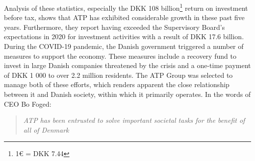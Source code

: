 Analysis of these statistics, especially the DKK 108 billion\footnote[0]{1€  = DKK 7.44} return on investment before tax, shows that ATP has exhibited considerable growth in these past five years. Furthermore, they report having exceeded the Supervisory Board's expectations in 2020 for investment activities with a result of DKK 17.6 billion.\cite{anno_report} During the COVID-19 pandemic, the Danish government triggered a number of measures to support the economy. These measures include a recovery fund to invest in large Danish companies threatened by the crisis and a one-time payment of DKK 1 000 to over 2.2 million residents. The ATP Group was selected to manage both of these efforts, which renders apparent the close relationship between it and Danish society, within which it primarily operates.\cite{covid_response} In the words of CEO Bo Foged:

\begin{quote}
    \color{dgreen} \textit{ATP has been entrusted to solve important societal tasks for the benefit of all of Denmark}
\end{quote}
